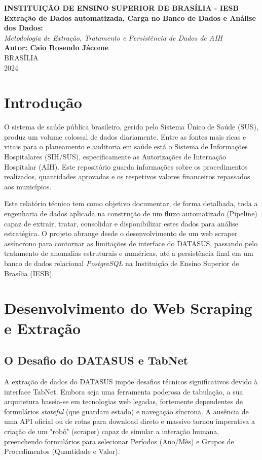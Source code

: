 \documentclass[12pt,a4paper]{report}
\begin{document}
\begin{titlepage}
\begin{center}
\large \textbf{INSTITUIÇÃO DE ENSINO SUPERIOR DE BRASÍLIA - IESB}\\
\vspace{4cm}
\Large \textbf{Extração de Dados automatizada, Carga no Banco de Dados e Análise dos Dados:}\\
\large \textit{Metodologia de Extração, Tratamento e Persistência de Dados de AIH}\\
\vspace{4cm}
\large \textbf{Autor: Caio Rosendo Jácome}\\
\vfill
\large BRASÍLIA\\
2024
\end{center}
\end{titlepage}

\tableofcontents

\chapter{Introdução}
O sistema de saúde pública brasileiro, gerido pelo Sistema Único de Saúde (SUS), produz um volume colossal de dados diariamente. Entre as fontes mais ricas e vitais para o planeamento e auditoria em saúde está o Sistema de Informações Hospitalares (SIH/SUS), especificamente as Autorizações de Internação Hospitalar (AIH). Este repositório guarda informações sobre os procedimentos realizados, quantidades aprovadas e os respetivos valores financeiros repassados aos municípios.

Este relatório técnico tem como objetivo documentar, de forma detalhada, toda a engenharia de dados aplicada na construção de um fluxo automatizado (Pipeline) capaz de extrair, tratar, consolidar e disponibilizar estes dados para análise estratégica. O projeto abrange desde o desenvolvimento de um web scraper assíncrono para contornar as limitações de interface do DATASUS, passando pelo tratamento de anomalias estruturais e numéricas, até a persistência final em um banco de dados relacional \textit{PostgreSQL} na Instituição de Ensino Superior de Brasília (IESB).

\chapter{Desenvolvimento do Web Scraping e Extração}

\section{O Desafio do DATASUS e TabNet}
A extração de dados do DATASUS impõe desafios técnicos significativos devido à interface TabNet. Embora seja uma ferramenta poderosa de tabulação, a sua arquitetura baseia-se em tecnologias web legadas, fortemente dependentes de formulários \textit{stateful} (que guardam estado) e navegação síncrona. A ausência de uma API oficial ou de rotas para download direto e massivo tornou imperativa a criação de um "robô" (scraper) capaz de simular a interação humana, preenchendo formulários para selecionar Períodos (Ano/Mês) e Grupos de Procedimentos (Quantidade e Valor).
\end{document}
